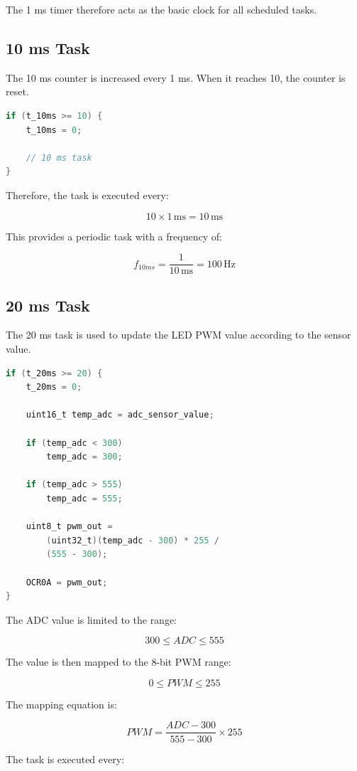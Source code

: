\documentclass[12pt,a4paper]{article}
\begin{document}
The 1 ms timer therefore acts as the basic clock for all scheduled
tasks.

\subsection{10 ms Task}

The 10 ms counter is increased every 1 ms. When it reaches 10, the
counter is reset.

\begin{lstlisting}[language=C]
if (t_10ms >= 10) {
    t_10ms = 0;

    // 10 ms task
}
\end{lstlisting}

Therefore, the task is executed every:

\[
10\times1\,\mathrm{ms}
=
10\,\mathrm{ms}
\]

This provides a periodic task with a frequency of:

\[
f_{10ms}
=
\frac{1}{10\,\mathrm{ms}}
=
100\,\mathrm{Hz}
\]

\subsection{20 ms Task}

The 20 ms task is used to update the LED PWM value according to the
sensor value.

\begin{lstlisting}[language=C]
if (t_20ms >= 20) {
    t_20ms = 0;

    uint16_t temp_adc = adc_sensor_value;

    if (temp_adc < 300)
        temp_adc = 300;

    if (temp_adc > 555)
        temp_adc = 555;

    uint8_t pwm_out =
        (uint32_t)(temp_adc - 300) * 255 /
        (555 - 300);

    OCR0A = pwm_out;
}
\end{lstlisting}

The ADC value is limited to the range:

\[
300 \leq ADC \leq 555
\]

The value is then mapped to the 8-bit PWM range:

\[
0 \leq PWM \leq 255
\]

The mapping equation is:

\[
PWM
=
\frac{ADC-300}{555-300}
\times255
\]

The task is executed every:
\end{document}

